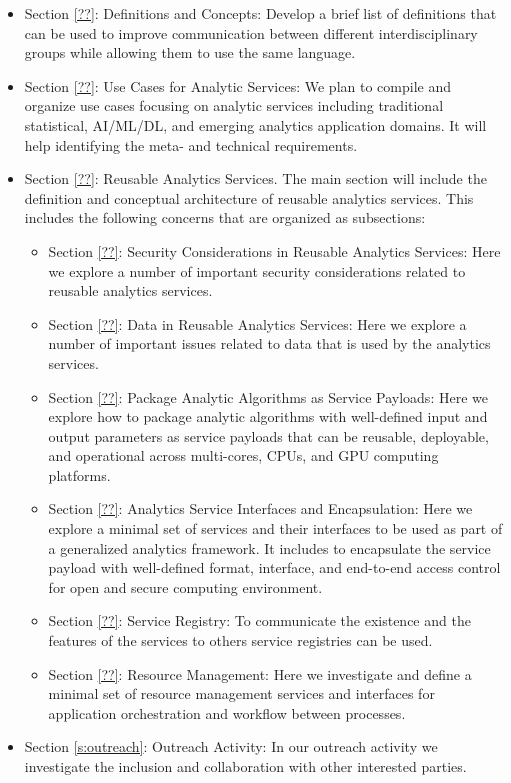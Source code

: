 \begin{itemize}
    \item Section \ref{??}: Definitions and Concepts: Develop a brief list of definitions that can be used to improve communication between different interdisciplinary groups while allowing them to use the same language.

\item Section \ref{??}: Use Cases for Analytic Services: We plan to compile and organize use cases focusing on analytic services including traditional statistical, AI/ML/DL, and emerging analytics application domains. It will help identifying the meta- and technical requirements.

\item Section \ref{??}: Reusable Analytics Services. The main section will include the definition and conceptual architecture of reusable analytics services. This includes the following concerns that are organized as subsections: 
  
  \begin{itemize}
  \item Section \ref{??}: Security Considerations in Reusable Analytics Services: Here we explore a number of important security considerations related to reusable analytics services.

  \item Section \ref{??}: Data in Reusable Analytics Services: Here we explore a number of important issues  related to data that is used by the analytics services.

  \item Section  \ref{??}: Package Analytic Algorithms as Service Payloads: Here we explore how to package analytic algorithms with well-defined input and output parameters as service payloads that can be reusable, deployable, and operational across multi-cores, CPUs, and GPU computing platforms.

  \item Section \ref{??}: Analytics Service Interfaces and Encapsulation: Here we explore a minimal set of services and their interfaces to be used as part of a generalized analytics framework. It includes to encapsulate the service payload with well-defined format, interface, and end-to-end access control for open and secure computing environment.
  
  \item Section \ref{??}: Service Registry: To communicate the existence and the features of the services to others service registries can be used.

  \item Section \ref{??}: Resource Management: Here we investigate and define a minimal set of resource management services and interfaces for application orchestration and workflow between processes.

  \end{itemize}

\item Section \ref{s:outreach}: Outreach Activity: In our outreach activity we investigate the inclusion and collaboration with other interested parties.

\end{itemize}

